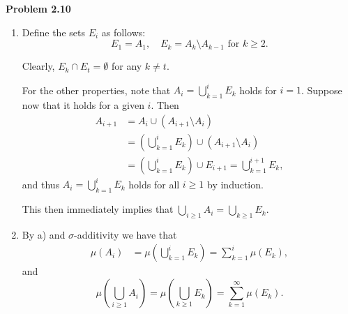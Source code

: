 \textbf{Problem 2.10} 

\begin{enumerate}[label=(\alph*)]
\item {}

Define the sets $E_i$ as follows:
\[
	E_1 = A_1, \quad E_k = A_k \setminus A_{k-1} \text{ for } k \ge 2.
\]

Clearly, $E_k \cap E_t = \emptyset$ for any $k \ne t$.

For the other properties, note that $A_i = \bigcup_{k = 1}^i E_k$ holds for $i = 1$. Suppose now that it holds for a given $i$. Then
\begin{align*}
	A_{i + 1} &= A_{i} \cup (A_{i+1} \setminus A_i) \\
	&= \left(\bigcup_{k = 1}^i E_k\right) \cup (A_{i+1} \setminus A_i)\\
	&= \left(\bigcup_{k = 1}^i E_k\right) \cup E_{i+1} = \bigcup_{k = 1}^{i+1} E_k,
\end{align*}
and thus $A_i = \bigcup_{k = 1}^i E_k$ holds for all $i \ge 1$ by induction. 

This then immediately implies that $\bigcup_{i \ge 1} A_i = \bigcup_{k \ge 1} E_k$.
\item {}


By a) and $\sigma$-additivity we have that
\begin{align*}
	\mu(A_i) &= \mu\left(\bigcup_{k = 1}^i E_k\right) = \sum_{k = 1}^i \mu(E_k),
\end{align*}
and 
\[
	\mu\left(\bigcup_{i \ge 1} A_i\right) = \mu\left(\bigcup_{k \ge 1} E_k\right) = \sum_{k = 1}^\infty \mu(E_k).
\]


\end{enumerate}
